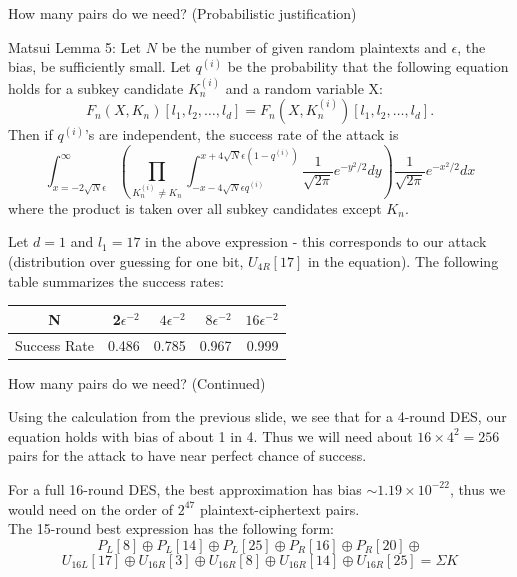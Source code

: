 \documentclass[9pt]{beamer}
\begin{document}
\begin{frame}
How many pairs do we need? (Probabilistic justification)

\vspace{3mm}
\pause Matsui Lemma 5: Let $N$ be the number of given random plaintexts and $\epsilon$, the bias, be sufficiently small. Let $q^{(i)}$ be the probability that the following equation holds for a subkey candidate $K_n^{(i)}$ and a random variable X:
\[ F_n(X,K_n)[l_1, l_2,\dots,l_d] = F_n(X, K_n^{(i)})[l_1, l_2, \dots, l_d].\]
\pause Then if $q^{(i)}$'s are independent, the success rate of the attack is
\[ \int_{x=-2\sqrt{N}\epsilon}^\infty \left( \prod_{K_n^{(i)} \neq K_n} \int_{-x-4\sqrt{N}\epsilon q^{(i)}}^{x+4\sqrt{N}\epsilon (1 - q^{(i)})} \frac{1}{\sqrt{2\pi}} e^{-y^2/2} dy \right) \frac{1}{\sqrt{2\pi}} e^{-x^2/2} dx \]
where the product is taken over all subkey candidates except $K_n$.

\vspace{3mm}
\pause Let $d = 1$ and $l_1 = 17$ in the above expression - this corresponds to our attack (distribution over guessing for one bit, $U_{4R}[17]$ in the equation). The following table summarizes the success rates:
\begin{center}
\begin{tabular}{|c|r|r|r|r|}
\hline
N & 2$\epsilon^{-2}$ & $4\epsilon^{-2}$ & $8\epsilon^{-2}$ & $16\epsilon^{-2}$ \\
\hline
Success Rate & 0.486 & 0.785 & 0.967 & 0.999 \\
\hline
\end{tabular} 
\end{center}
\end{frame}

\begin{frame}
How many pairs do we need? (Continued)

\vspace{3mm}
Using the calculation from the previous slide, we see that for a 4-round DES, our equation holds with bias of about 1 in 4. \pause Thus we will need about $16\times 4^2 = 256$ pairs for the attack to have near perfect chance of success.

\vspace{3mm}
\pause For a full 16-round DES, the best approximation has bias $\sim 1.19\times 10^{-22}$, thus we would need on the order of $2^{47}$ plaintext-ciphertext pairs.\\
\vspace{3mm}
The 15-round best expression has the following form:
\[ P_L[8] \oplus P_L[14] \oplus P_L[25] \oplus P_R[16] \oplus P_R[20] \oplus \]
\[  U_{16L}[17] \oplus U_{16R}[3] \oplus U_{16R}[8] \oplus U_{16R}[14] \oplus U_{16R}[25] = \Sigma K \]
\end{frame}
\end{document}
